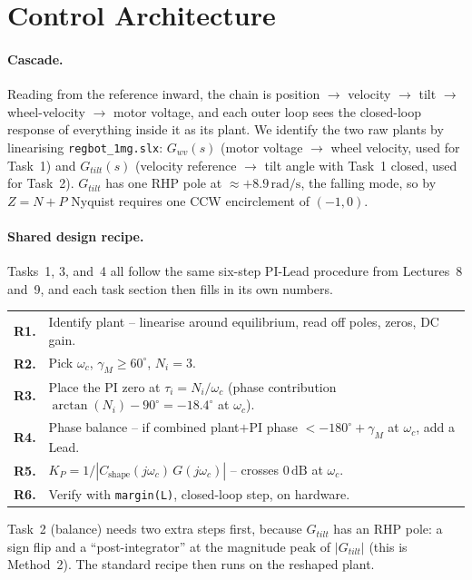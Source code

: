 \section{Control Architecture}
\label{sec:architecture}

\paragraph{Cascade.} Reading from the reference inward, the chain is position $\to$ velocity $\to$ tilt $\to$ wheel-velocity $\to$ motor voltage, and each outer loop sees the closed-loop response of everything inside it as its plant. We identify the two raw plants by linearising \texttt{regbot\_1mg.slx}: $G_{wv}(s)$ (motor voltage $\to$ wheel velocity, used for Task~1) and $G_{tilt}(s)$ (velocity reference $\to$ tilt angle with Task~1 closed, used for Task~2). $G_{tilt}$ has one RHP pole at $\approx +8.9\,\mathrm{rad/s}$, the falling mode, so by $Z = N + P$ Nyquist requires one CCW encirclement of $(-1,0)$.

\paragraph{Shared design recipe.} Tasks~1, 3, and~4 all follow the same six-step PI-Lead procedure from Lectures~8 and~9, and each task section then fills in its own numbers.

\begin{center}\small
\begin{tabular}{rl}
\textbf{R1.} & Identify plant -- linearise around equilibrium, read off poles, zeros, DC gain. \\
\textbf{R2.} & Pick $\omega_c$, $\gamma_M \geq 60^{\circ}$, $N_i = 3$. \\
\textbf{R3.} & Place the PI zero at $\tau_i = N_i/\omega_c$ (phase contribution $\arctan(N_i) - 90^{\circ} = -18.4^{\circ}$ at $\omega_c$). \\
\textbf{R4.} & Phase balance -- if combined plant$+$PI phase $< -180^{\circ} + \gamma_M$ at $\omega_c$, add a Lead. \\
\textbf{R5.} & $K_P = 1 / |C_{\mathrm{shape}}(j\omega_c)\,G(j\omega_c)|$ -- crosses $0\,\mathrm{dB}$ at $\omega_c$. \\
\textbf{R6.} & Verify with \texttt{margin(L)}, closed-loop step, on hardware. \\
\end{tabular}
\end{center}
Task~2 (balance) needs two extra steps first, because $G_{tilt}$ has an RHP pole: a sign flip and a ``post-integrator'' at the magnitude peak of $|G_{tilt}|$ (this is Method~2). The standard recipe then runs on the reshaped plant.

